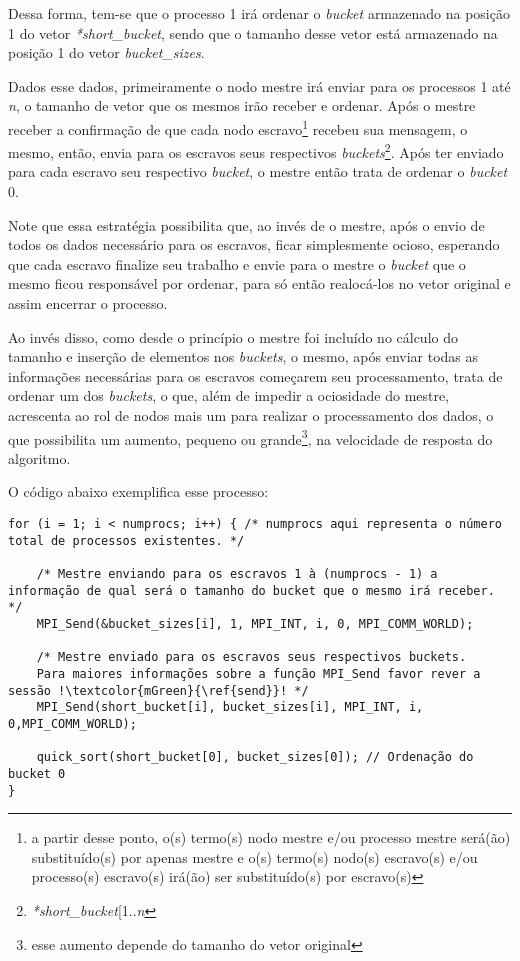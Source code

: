 			Dessa forma, tem-se que o processo 1 irá ordenar o \textit{bucket} armazenado na posição 1 do vetor \textit{*short\_bucket}, sendo que o tamanho desse vetor está armazenado na posição 1 do vetor \textit{bucket\_sizes}.
			
			Dados esse dados, primeiramente o nodo mestre irá enviar para os processos 1 até \textit{n}, o tamanho de vetor que os mesmos irão receber e ordenar. Após o mestre receber a confirmação de que cada nodo escravo\footnote{a partir desse ponto, o(s) termo(s) nodo mestre e/ou processo mestre será(ão) substituído(s) por apenas mestre e o(s) termo(s) nodo(s) escravo(s) e/ou processo(s) escravo(s) irá(ão) ser substituído(s) por escravo(s)} recebeu sua mensagem, o mesmo, então, envia para os escravos seus respectivos \textit{buckets}\footnote{\textit{*short\_bucket}[1..\textit{n}}. Após ter enviado para cada escravo seu respectivo \textit{bucket}, o mestre então trata de ordenar o \textit{bucket} 0. 

			Note que essa estratégia possibilita que, ao invés de o mestre, após o envio de todos os dados necessário para os escravos, ficar simplesmente ocioso, esperando que cada escravo finalize seu trabalho e envie para o mestre o \textit{bucket} que o mesmo ficou responsável por ordenar, para só então realocá-los no vetor original e assim encerrar o processo. 
			
			Ao invés disso, como desde o princípio o mestre foi incluído no cálculo do tamanho e inserção de elementos nos \textit{buckets}, o mesmo, após enviar todas as informações necessárias para os escravos começarem seu processamento, trata de ordenar um dos \textit{buckets}, o que, além de impedir a ociosidade do mestre, acrescenta ao rol de nodos mais um para realizar o processamento dos dados, o que possibilita um aumento, pequeno ou grande\footnote{esse aumento depende do tamanho do vetor original}, na velocidade de resposta do algoritmo.
		
			O código abaixo exemplifica esse processo:			
			\newpage
			\begin{lstlisting}[style=C]		
for (i = 1; i < numprocs; i++) { /* numprocs aqui representa o número total de processos existentes. */

	/* Mestre enviando para os escravos 1 à (numprocs - 1) a informação de qual será o tamanho do bucket que o mesmo irá receber. */
	MPI_Send(&bucket_sizes[i], 1, MPI_INT, i, 0, MPI_COMM_WORLD); 

	/* Mestre enviado para os escravos seus respectivos buckets.
	Para maiores informações sobre a função MPI_Send favor rever a sessão !\textcolor{mGreen}{\ref{send}}! */
	MPI_Send(short_bucket[i], bucket_sizes[i], MPI_INT, i, 0,MPI_COMM_WORLD);
	
	quick_sort(short_bucket[0], bucket_sizes[0]); // Ordenação do bucket 0
}
\end{lstlisting}
			
